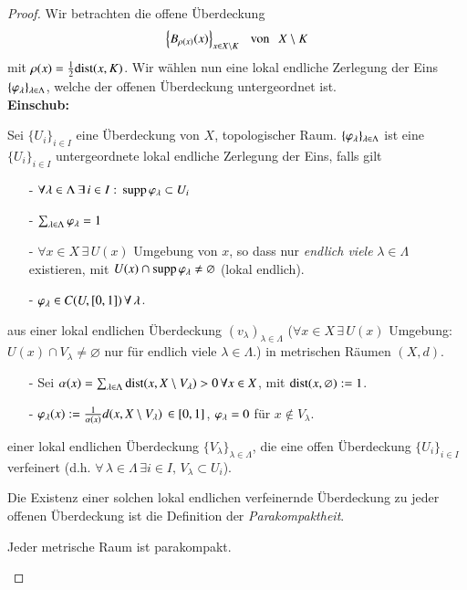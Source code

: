 \begin{proof}
    Wir betrachten die offene Überdeckung
    \[
        \left\{ B_{\rho(x)}(x) \right\}_{x\in X\setminus K} \hspace{.25cm} \text{von} \hspace{.25cm} X\setminus K
    \]
    mit $\rho(x)=\frac12 \mathrm{dist}(x,K)$.
    Wir wählen nun eine lokal endliche Zerlegung der Eins $\{\varphi_\lambda\}_{\lambda\in \Lambda}$, welche
    der offenen Überdeckung untergeordnet ist.\\[.5cm]

    \noindent \textbf{Einschub:}
    \begin{description}
        \item[Zerlegung der Eins:]
        Sei $\{U_i\}_{i\in I}$ eine Überdeckung von $X$, topologischer Raum. $\{\varphi_\lambda\}_{\lambda\in
        \Lambda}$ ist eine $\{U_i\}_{i\in I}$ untergeordnete lokal endliche Zerlegung der Eins,
        falls gilt
        \begin{itemize}
        \item[-] $\forall \lambda\in \Lambda\, \exists \, i \in I: \, \mathrm{supp}\, \varphi_\lambda\subset U_i$
        \item[-] $\sum_{\lambda \in \Lambda} \varphi _\lambda=1$
        \item[-] $\forall x \in X \, \exists \, U(x)$ Umgebung von $x$, so dass nur
        \textit{endlich viele} $\lambda \in \Lambda$ existieren, mit $U(x)\cap \mathrm{supp}\, \varphi_\lambda\neq 
        \varnothing$ (lokal endlich).
        \item[-] $\varphi_\lambda \in C(U,[0,1]) \,\forall\, \lambda$. 
        \end{itemize}
        \item[Konstruktion] aus einer lokal endlichen Überdeckung $(v_\lambda)_{\lambda\in\Lambda}$ 
        ($\forall x\in X \, \exists \, U(x)$ Umgebung: $U(x)\cap V_\lambda\neq \varnothing$ nur für
         endlich viele $\lambda\in \Lambda$.) in metrischen Räumen $(X,d)$.
        \begin{itemize}
            \item[-] Sei $\alpha(x)=\sum_{\lambda\in \Lambda} \mathrm{dist}(x,X\setminus V_\lambda)>0 \, \forall
            x \in X$, mit $\mathrm{dist}(x,\varnothing):=1$.
            \item[-] $\varphi _\lambda(x):=\frac{1}{\alpha(x)}d(x,X\setminus V_\lambda) \, \in [0,1]$,
            $\varphi_\lambda=0$ für $x\nin V_\lambda$.
        \end{itemize}
        \item[„Konstruktion“] einer lokal endlichen Überdeckung $\{V_\lambda\}_{\lambda\in\Lambda}$, die
        eine offen Überdeckung $\{U_i\}_{i\in I}$ verfeinert (d.h. $\forall \, \lambda\in \Lambda \, 
        \exists i \in I, \, V_\lambda\subset U_i$).
        \item{Die Existenz} einer solchen lokal endlichen verfeinernde Überdeckung zu jeder offenen
        Überdeckung ist die Definition der \textit{Parakompaktheit}.
        \begin{theorem*}
            Jeder metrische Raum ist parakompakt.
        \end{theorem*}
        

\end{description}
\end{proof}
